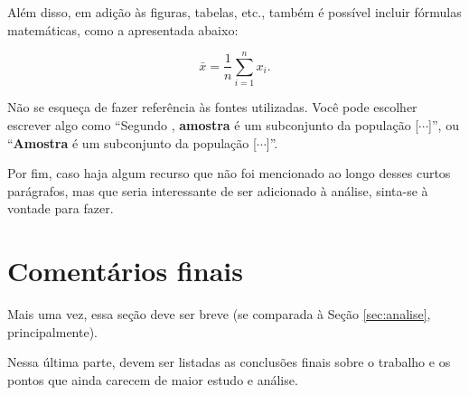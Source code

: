 \documentclass[12pt]{article}
\begin{document}
	\par Além disso, em adição às figuras, tabelas, etc., também é possível incluir fórmulas matemáticas, como a apresentada abaixo:
	
	\begin{equation}
		\bar{x} = \frac{1}{n}\sum_{i = 1}^{n}x_i.
	\end{equation}
	
	\par Não se esqueça de fazer referência às fontes utilizadas. Você pode escolher escrever algo como ``Segundo  \citet{magalhaes2002nocoes}, \textbf{amostra} é um subconjunto da população [$\cdots$]'', ou ``\textbf{Amostra} é um subconjunto da população \citep{magalhaes2002nocoes} [$\cdots$]''.
	
	\par Por fim, caso haja algum recurso que não foi mencionado ao longo desses curtos parágrafos, mas que seria interessante de ser adicionado à análise, sinta-se à vontade para fazer.
	
	\section{Comentários finais} \label{sec:final}
	
	\par Mais uma vez, essa seção deve ser breve (se comparada à Seção \ref{sec:analise}, principalmente). 
	
	\par Nessa última parte, devem ser listadas as conclusões finais sobre o trabalho e os pontos que ainda carecem de maior estudo e análise.
	
	
	
	
\end{document}
